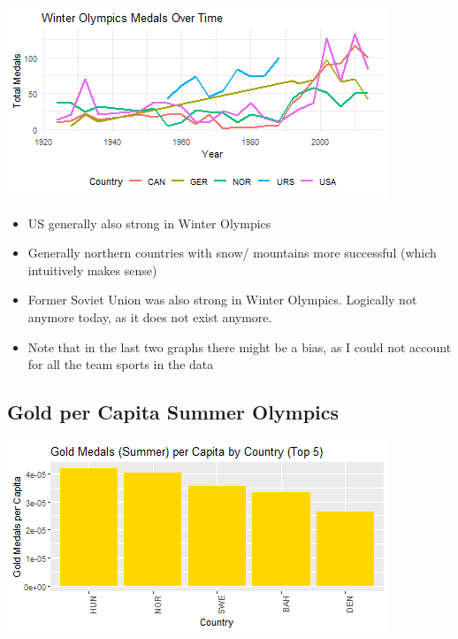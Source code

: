 \documentclass[11pt,preprint, authoryear]{elsarticle}
\let\origfigure\figure
\let\endorigfigure\endfigure
\renewenvironment{figure}[1][2] {
    \expandafter\origfigure\expandafter[H]
} {
    \endorigfigure
}
\numberwithin{equation}{section}
\numberwithin{figure}{section}
\numberwithin{table}{section}
\def\tightlist{} %
\begin{document}
\begin{figure}[H]

{\centering \includegraphics{Question4_files/figure-latex/Figure3-1} 

}

\caption{Top Countries Winter Olympics \label{Figure3}}\label{fig:Figure3}
\end{figure}

\begin{itemize}
\tightlist
\item
  US generally also strong in Winter Olympics
\item
  Generally northern countries with snow/ mountains more successful
  (which intuitively makes sense)
\item
  Former Soviet Union was also strong in Winter Olympics. Logically not
  anymore today, as it does not exist anymore.
\item
  Note that in the last two graphs there might be a bias, as I could not
  account for all the team sports in the data
\end{itemize}

\hypertarget{gold-per-capita-summer-olympics}{%
\subsection{Gold per Capita Summer
Olympics}\label{gold-per-capita-summer-olympics}}

\begin{figure}[H]

{\centering \includegraphics{Question4_files/figure-latex/Figure4-1} 

}

\caption{Gold per Capita Summer Olympics \label{Figure4}}\label{fig:Figure4}
\end{figure}
\end{document}
